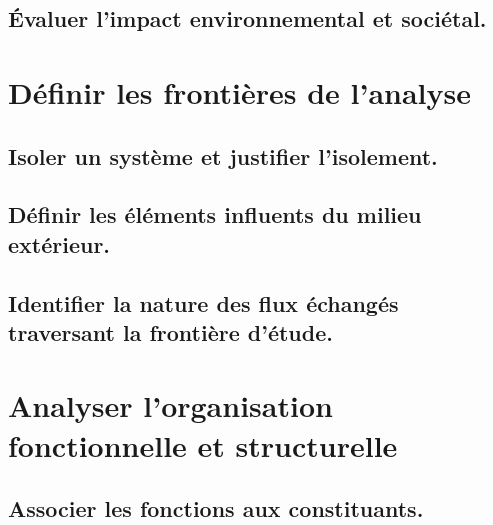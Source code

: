 \documentclass[10pt,fleqn]{article}
\begin{document}
\subsection{Évaluer l’impact environnemental et sociétal.} 

\begin{multicols}{2} 

\end{multicols}

\section{Définir les frontières de l'analyse} 

\subsection{Isoler un système et justifier l’isolement.} 

\begin{multicols}{2} 

\end{multicols}

\subsection{Définir les éléments influents du milieu extérieur. } 

\begin{multicols}{2} 

\end{multicols}

\subsection{Identifier la nature des flux échangés traversant la frontière d’étude.} 

\begin{multicols}{2} 

\end{multicols}

\section{Analyser l'organisation fonctionnelle et structurelle} 

\subsection{Associer les fonctions aux constituants.} 
\end{document}
